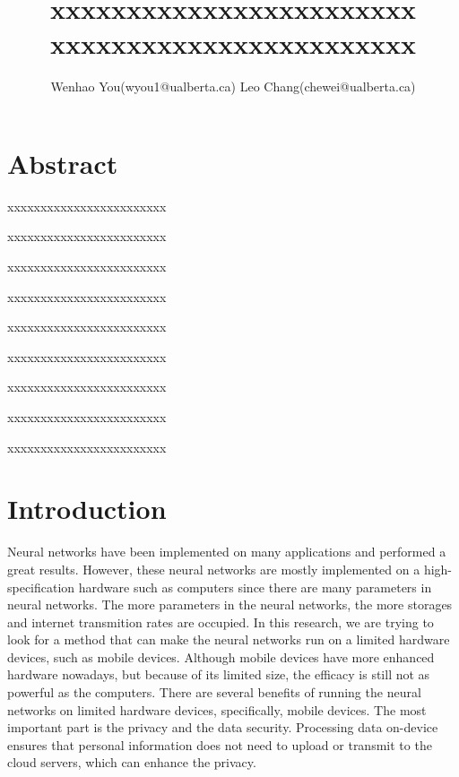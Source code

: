 \documentclass[UTF8]{article}
\title{xxxxxxxxxxxxxxxxxxxxxxxx xxxxxxxxxxxxxxxxxxxxxxxx}
\author{Wenhao You(wyou1@ualberta.ca) Leo Chang(chewei@ualberta.ca)}
\date{}
\begin{document}
	\maketitle
	
	
	
	
	
	
	\section*{Abstract}
	
	xxxxxxxxxxxxxxxxxxxxxxxx
	
	xxxxxxxxxxxxxxxxxxxxxxxx
	
	xxxxxxxxxxxxxxxxxxxxxxxx
	
	xxxxxxxxxxxxxxxxxxxxxxxx
	
	xxxxxxxxxxxxxxxxxxxxxxxx
	
	xxxxxxxxxxxxxxxxxxxxxxxx
	
	xxxxxxxxxxxxxxxxxxxxxxxx
	
	xxxxxxxxxxxxxxxxxxxxxxxx
	
	xxxxxxxxxxxxxxxxxxxxxxxx
	
	\section*{Introduction}
	
Neural networks have been implemented on many applications and performed a great results. However, these neural networks are mostly implemented on a high-specification hardware such as computers since there are many parameters in neural networks. The more parameters in the neural networks, the more storages and internet transmition rates are occupied. In this research, we are trying to look for a method that can make the neural networks run on a limited hardware devices, such as mobile devices. Although mobile devices have more enhanced hardware nowadays, but because of its limited size, the efficacy is still not as powerful as the computers. There are several benefits of running the neural networks on limited hardware devices, specifically, mobile devices. The most important part is the privacy and the data security. Processing data on-device ensures that personal information does not need to upload or transmit to the cloud servers, which can enhance the privacy. 
\end{document}
